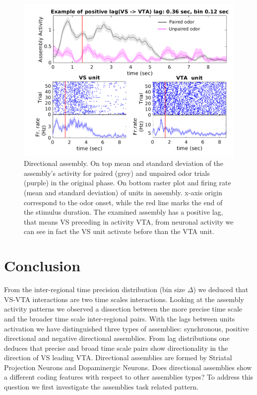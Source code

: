 \begin{figure}
    \centering
    \includegraphics[scale=0.4]{figures/1_21Lastrev1Pru_An4Poster2.png}
    \caption{Directional assembly. On top mean and standard deviation of the assembly's activity for paired (grey) and unpaired odor trials (purple) in the original phase. On bottom raster plot and firing rate (mean and standard deviation) of units in assembly. x-axis origin correspond to the odor onset, while the red line marks the end of the stimulus duration. The examined assembly has a positive lag, that means VS preceding in activity VTA, from neuronal activity we can see in fact the VS unit activate before than the VTA unit.}
    \label{fig:directional_assembly}
\end{figure}
\section{Conclusion}
From the inter-regional time precision distribution (bin size $\Delta$) we deduced that VS-VTA interactions are two time scales interactions. Looking at the assembly activity patterns we observed a dissection between the more precise time scale and the broader time scale inter-regional pairs. 
With the lags between units activation we have distinguished three types of assemblies: synchronous, positive directional and negative directional assemblies. From lag distributions one deduces that precise and broad time scale pairs show directionality in the direction of VS leading VTA.
Directional assemblies are formed by Striatal Projection Neurons and Dopaminergic Neurons.
Does directional assemblies show a different coding features with respect to other assemblies types?
To address this question we first investigate the assemblies task related pattern.
  
